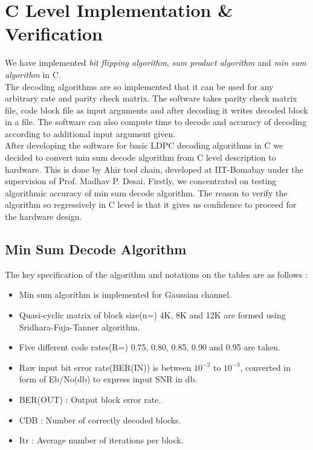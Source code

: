 
\chapter{C Level Implementation \& Verification} 

\label{Chapter4} 


We have implemented \textit{bit flipping algorithm}, \textit{sum product algorithm} and \textit{min sum algorithm} in C. \\
The decoding algorithms are so implemented that it can be used for any arbitrary rate and parity check matrix. The software takes parity check matrix file, code block file as input arguments and after decoding it writes decoded block in a file. The software can also compute time to decode and accuracy of decoding according to additional input argument given. \\

After developing the software for basic LDPC decoding algorithms in C we decided to convert min sum decode algorithm from C level description to hardware. This is done by Ahir tool chain, developed at IIT-Bomabay under the supervision of Prof. Madhav P. Desai. Firstly, we concentrated on testing algorithmic accuracy of min sum decode algorithm. The reason to verify the algorithm so regressively in C level is that it gives us confidence to proceed for the hardware design.  

\section{ Min Sum Decode Algorithm}
The key specification of the algorithm and notations on the tables are as follows :
\begin{itemize}
\item Min sum algorithm is implemented for Gaussian channel. 
\item Quasi-cyclic matrix of block size(n=) 4K, 8K and 12K  are formed using Sridhara-Fuja-Tanner algorithm.
\item Five different code rates(R=) 0.75, 0.80, 0.85, 0.90 and 0.95 are taken.
\item Raw input bit error rate(BER(IN)) is between $10^{-2}$ to $10^{-3}$, converted in form of Eb/No(db) to express input SNR in db. 
\item BER(OUT) : Output block error rate.
\item CDB : Number of correctly decoded blocks.  
\item Itr : Average number of iterations per block.
\end{itemize}



